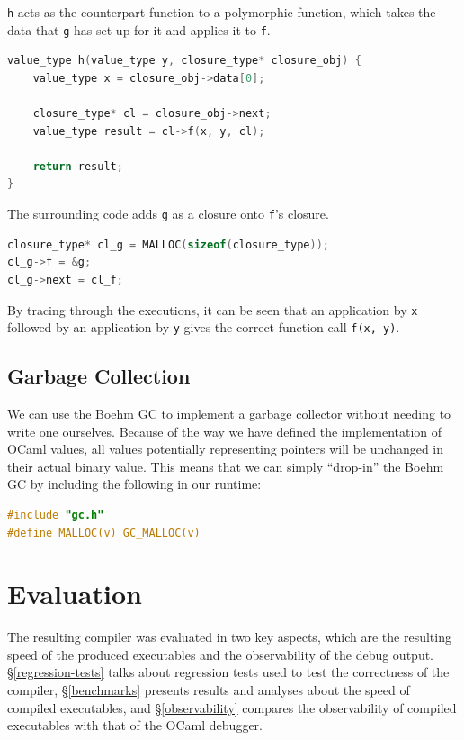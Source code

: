 \texttt{h} acts as the counterpart function to a polymorphic function, which 
takes the data that \texttt{g} has set up for it and applies it to \texttt{f}.

\begin{lstlisting}[language=C]
value_type h(value_type y, closure_type* closure_obj) {
    value_type x = closure_obj->data[0];
    
    closure_type* cl = closure_obj->next;
    value_type result = cl->f(x, y, cl);
    
    return result;
}
\end{lstlisting}

The surrounding code adds \texttt{g} as a closure onto \texttt{f}'s closure.

\begin{lstlisting}[language=C]
closure_type* cl_g = MALLOC(sizeof(closure_type));
cl_g->f = &g;
cl_g->next = cl_f;
\end{lstlisting}

By tracing through the executions, it can be seen that an application by 
\texttt{x} followed by an application by \texttt{y} gives the correct function 
call \texttt{f(x, y)}.

\section{Garbage Collection}\label{gc}

We can use the Boehm GC to implement a garbage collector without needing to
write one ourselves. Because of the way we have defined the implementation of
OCaml values, all values potentially representing pointers will be unchanged in
their actual binary value. This means that we can simply ``drop-in'' the Boehm
GC by including the following in our runtime:

\begin{lstlisting}[language=C]
#include "gc.h"
#define MALLOC(v) GC_MALLOC(v)
\end{lstlisting}

\chapter{Evaluation}

The resulting compiler was evaluated in two key aspects, which are the 
resulting speed of the produced executables and the observability of the debug 
output. \S\ref{regression-tests} talks about regression tests used to test the
correctness of the compiler, \S\ref{benchmarks} presents results and analyses
about the speed of compiled executables, and \S\ref{observability} compares the
observability of compiled executables with that of the OCaml debugger.

